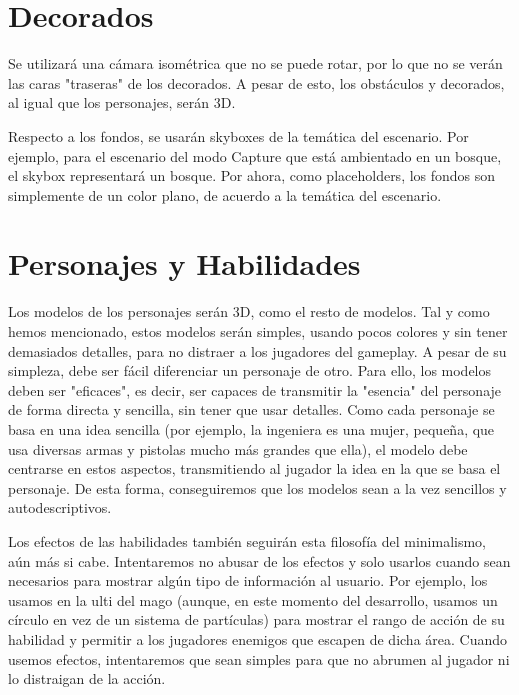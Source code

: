 \section{Decorados}
    
Se utilizará una cámara isométrica que no se puede rotar, por lo que no se verán las caras "traseras" de los decorados. A pesar de esto, los obstáculos y decorados, al igual que los personajes, serán 3D.

Respecto a los fondos, se usarán skyboxes de la temática del escenario. Por ejemplo, para el escenario del modo Capture que está ambientado en un bosque, el skybox representará un bosque. Por ahora, como placeholders, los fondos son simplemente de un color plano, de acuerdo a la temática del escenario.

\section{Personajes y Habilidades}
Los modelos de los personajes serán 3D, como el resto de modelos. Tal y como hemos mencionado, estos modelos serán simples, usando pocos colores y sin tener demasiados detalles, para no distraer a los jugadores del gameplay. A pesar de su simpleza, debe ser fácil diferenciar un personaje de otro. Para ello, los modelos deben ser "eficaces", es decir, ser capaces de transmitir la "esencia" del personaje de forma directa y sencilla, sin tener que usar detalles. Como cada personaje se basa en una idea sencilla (por ejemplo, la ingeniera es una mujer, pequeña, que usa diversas armas y pistolas mucho más grandes que ella), el modelo debe centrarse en estos aspectos, transmitiendo al jugador la idea en la que se basa el personaje. De esta forma, conseguiremos que los modelos sean a la vez sencillos y autodescriptivos.

\vspace{\baselineskip}

Los efectos de las habilidades también seguirán esta filosofía del minimalismo, aún más si cabe. Intentaremos no abusar de los efectos y solo usarlos cuando sean necesarios para mostrar algún tipo de información al usuario. Por ejemplo, los usamos en la ulti del mago (aunque, en este momento del desarrollo, usamos un círculo en vez de un sistema de partículas) para mostrar el rango de acción de su habilidad y permitir a los jugadores enemigos que escapen de dicha área. Cuando usemos efectos, intentaremos que sean simples para que no abrumen al jugador ni lo distraigan de la acción.